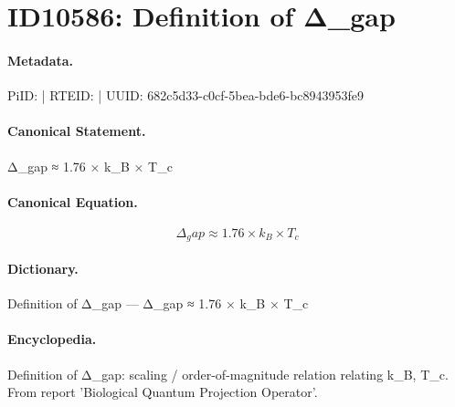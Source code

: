 \section*{ID10586: Definition of Δ\_gap}
\paragraph{Metadata.}
PiID:  | RTEID:  | UUID: 682c5d33-c0cf-5bea-bde6-bc8943953fe9

\paragraph{Canonical Statement.}
Δ\_gap ≈ 1.76 × k\_B × T\_c

\paragraph{Canonical Equation.}
\[
Δ_gap ≈ 1.76 × k_B × T_c
\]

\paragraph{Dictionary.}
Definition of Δ\_gap — Δ\_gap ≈ 1.76 × k\_B × T\_c

\paragraph{Encyclopedia.}
Definition of Δ\_gap: scaling / order-of-magnitude relation relating k\_B, T\_c. From report 'Biological Quantum Projection Operator'.
